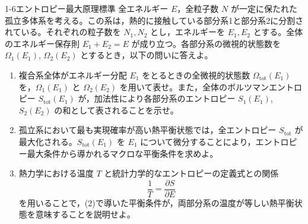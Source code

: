 
\begin{mondai}{1-6}{エントロピー最大原理}{標準}
全エネルギー $E$，全粒子数 $N$ が一定に保たれた孤立多体系を考える。この系は，熱的に接触している部分系1と部分系2に分割されている。それぞれの粒子数を $N_1, N_2$ とし，エネルギーを $E_1, E_2$ とする。全体のエネルギー保存則 $E_1 + E_2 = E$ が成り立つ。各部分系の微視的状態数を $\Omega_1(E_1)$, $\Omega_2(E_2)$ とするとき，以下の問いに答えよ。

\begin{enumerate}
  \item 複合系全体がエネルギー分配 $E_1$ をとるときの全微視的状態数 $\Omega_{\mathrm{tot}}(E_1)$ を，$\Omega_1(E_1)$ と $\Omega_2(E_2)$ を用いて表せ。また，全体のボルツマンエントロピー $S_{\mathrm{tot}}(E_1)$ が，加法性により各部分系のエントロピー $S_1(E_1)$, $S_2(E_2)$ の和として表されることを示せ。

  \item 孤立系において最も実現確率が高い熱平衡状態では，全エントロピー $S_{\mathrm{tot}}$ が最大化される。$S_{\mathrm{tot}}(E_1)$ を $E_1$ について微分することにより，エントロピー最大条件から導かれるマクロな平衡条件を求めよ。

  \item 熱力学における温度 $T$ と統計力学的なエントロピーの定義式との関係
  \begin{equation*}
  \frac{1}{T} = \frac{\partial S}{\partial E}
  \end{equation*}
  を用いることで，(2)で導いた平衡条件が，両部分系の温度が等しい熱平衡状態を意味することを説明せよ。
\end{enumerate}
\end{mondai}

